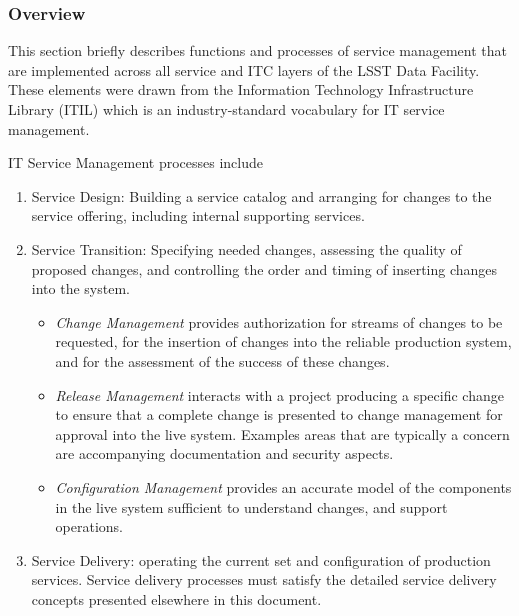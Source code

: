 \subsubsection{Overview}
This section briefly describes functions and processes of service
management that are implemented across all service and ITC layers of
the LSST Data Facility. These elements were drawn from the Information
Technology Infrastructure Library (ITIL) which is an industry-standard
vocabulary for IT service management.

IT Service Management processes include

\begin{enumerate}

\item Service Design: Building a service catalog and arranging for changes to the service offering, including internal supporting services.

\item Service Transition: Specifying needed changes, assessing the quality of proposed changes,
and controlling the order and timing of inserting changes into the system.

  \begin{itemize}

  \item \emph{Change Management} provides authorization for streams of changes to be requested, for the insertion of changes into the reliable production system, and for the assessment of the success of these changes.

  \item \emph{Release Management} interacts with a project producing a specific change to ensure that
a complete change is presented to change management for approval into the live system. Examples areas that are typically a concern are accompanying documentation and security aspects.

  \item \emph{Configuration Management} provides an accurate model of the components in the live system sufficient to understand changes, and support operations.

  \end{itemize}

\item Service Delivery: operating the current set and configuration of production services. Service delivery processes must satisfy the detailed service delivery concepts presented elsewhere in this document.

  \begin{itemize}


\end{itemize}
\end{enumerate}
